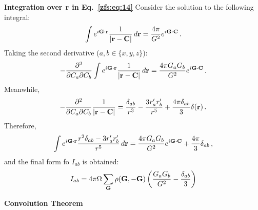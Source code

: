 \textbf{Integration over $\mathbf{r}$ in Eq.~\ref{zfs:eq:14}}
Consider the solution to the following integral:
\begin{align}
    \int e^{i\mathbf{G}\cdot\mathbf{r}} \frac{1}{|\mathbf{r}-\mathbf{C}|} \, d\mathbf{r} = \frac{4\pi}{G^2}e^{i\mathbf{G}\cdot\mathbf{C}}\, .
\end{align}
Taking the second derivative ($a,b\in \{x,y,z\}$):
\begin{align}
    -\frac{\partial^2}{\partial C_a \partial C_b} \int e^{i\mathbf{G}\cdot\mathbf{r}} \frac{1}{|\mathbf{r}-\mathbf{C}|} \, d\mathbf{r}
    = \frac{4\pi G_a G_b}{G^2}e^{i\mathbf{G}\cdot\mathbf{C}}\, .
\end{align}
Meanwhile,
\begin{align}
    -\frac{\partial^2}{\partial C_a \partial C_b} \frac{1}{|\mathbf{r}-\mathbf{C}|}
    = \frac{\delta_{ab}}{r^3} - \frac{3r_a'r_b'}{r^5} + \frac{4\pi\delta_{ab}}{3}\delta(\mathbf{r})\, .
\end{align}
Therefore,
\begin{align}
    \int e^{i\mathbf{G}\cdot\mathbf{r}} \frac{r^2\delta_{ab} - 3r_a'r_b'}{r^5}\, d\mathbf{r} =
    \frac{4\pi G_a G_b}{G^2}e^{i\mathbf{G}\cdot\mathbf{C}} + \frac{4\pi}{3}\delta_{ab} \, ,
\end{align}
and the final form fo $I_{ab}$ is obtained:
\begin{align}
    I_{ab} = 4\pi\Omega \sum_{\mathbf{G}} \rho(\mathbf{G},-\mathbf{G}) \left( \frac{G_aG_b}{G^2} - \frac{\delta_{ab}}{3} \right)
\end{align}


\textbf{Convolution Theorem}

